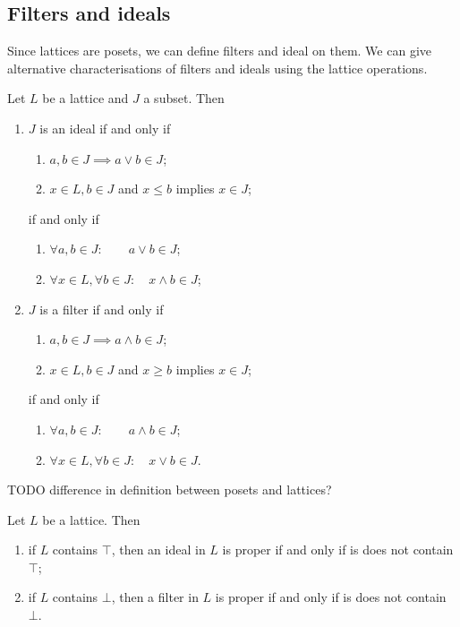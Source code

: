 \subsection{Filters and ideals}
Since lattices are posets, we can define filters and ideal on them.
We can give alternative characterisations of filters and ideals using the lattice operations.
\begin{lemma}
Let $L$ be a lattice and $J$ a subset. Then
\begin{enumerate}
\item $J$ is an ideal \textup{if and only if}
\begin{enumerate}
\item $a,b\in J \implies a\vee b\in J$;
\item $x\in L, b\in J$ and $x\leq b$ implies $x\in J$;
\end{enumerate}
\textup{if and only if}
\begin{enumerate}
\item $\forall a,b\in J: \qquad a\vee b\in J$;
\item $\forall x\in L, \forall b\in J: \quad x\wedge b \in J$;
\end{enumerate}
\item $J$ is a filter \textup{if and only if}
\begin{enumerate}
\item $a,b\in J \implies a\wedge b\in J$;
\item $x\in L, b\in J$ and $x\geq b$ implies $x\in J$;
\end{enumerate}
\textup{if and only if}
\begin{enumerate}
\item $\forall a,b\in J: \qquad a\wedge b\in J$;
\item $\forall x\in L, \forall b\in J: \quad x\vee b \in J$.
\end{enumerate}
\end{enumerate}
\end{lemma}

TODO difference in definition between posets and lattices?

\begin{lemma}
Let $L$ be a lattice. Then
\begin{enumerate}
\item if $L$ contains $\top$, then an ideal in $L$ is proper \textup{if and only if} is does not contain $\top$;
\item if $L$ contains $\bot$, then a filter in $L$ is proper \textup{if and only if} is does not contain $\bot$.
\end{enumerate}
\end{lemma}

